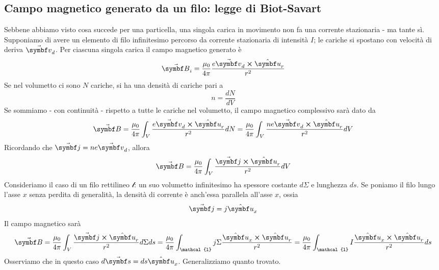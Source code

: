 \subsection{Campo magnetico generato da un filo: legge di Biot-Savart}
Sebbene abbiamo visto cosa succede per una particella, una singola carica in movimento non fa una corrente stazionaria - ma tante sì. Supponiamo di avere un elemento di filo infinitesimo percorso da corrente stazionaria di intensità $I$; le cariche si spostano con velocità di deriva $\vba{v}_d$. Per ciascuna singola carica il campo magnetico generato è
\begin{equation*}
	\vba{B}_i=\frac{\mu_0}{4\pi}\frac{e\vba{v}_d\cross\vbh{u}_r}{r^2}
\end{equation*}
Se nel volumetto ci sono $N$ cariche, si ha una densità di cariche pari a
\begin{equation*}
	n=\frac{dN}{dV}
\end{equation*}
Se sommiamo - con continuità - rispetto a tutte le cariche nel volumetto, il campo magnetico complessivo sarà dato da
\begin{equation*}
	\vba{B}=\frac{\mu_0}{4\pi}\int_V\frac{e\vba{v}_d\cross\vbh{u}_r}{r^2}dN=\frac{\mu_0}{4\pi}\int_V\frac{ne\vba{v}_d\cross\vbh{u}_r}{r^2}dV
\end{equation*}
Ricordando che $\vba{j}=ne\vba{v}_d$, allora
\begin{equation*}
	\vba{B}=\frac{\mu_0}{4\pi}\int_V\frac{\vba{j}\cross\vbh{u}_r}{r^2}dV
\end{equation*}
Consideriamo il caso di un filo rettilineo  $\mathcal{l}$: un suo volumetto infinitesimo ha spessore costante $d\Sigma$ e lunghezza $ds$. Se poniamo il filo lungo l'asse $x$ senza perdita di generalità, la densità di corrente è anch'essa parallela all'asse $x$, ossia
\begin{equation*}
	\vba{j}=j\vbh{u}_x
\end{equation*}
Il campo magnetico sarà
\begin{equation*}
	\vba{B}=\frac{\mu_0}{4\pi}\int_V\frac{\vba{j}\cross\vbh{u}_r}{r^2}d\Sigma ds=\frac{\mu_0}{4\pi}\int_{\mathcal{l}}j\Sigma\frac{\vbh{u}_x\cross\vbh{u}_r}{r^2}=\frac{\mu_0}{4\pi}\int_{\mathcal{l}}I\frac{\vbh{u}_x\cross\vbh{u}_r}{r^2}ds
\end{equation*}
Osserviamo che in questo caso $d\vba{s}=ds\vbh{u}_x$. Generalizziamo quanto trovato.

